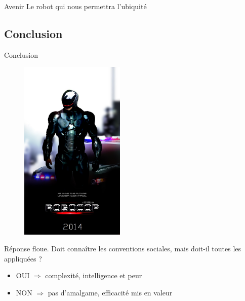 \documentclass{beamer}
\begin{document}
\begin{frame}{Avenir}
  Le robot qui nous permettra l'ubiquité\\
\end{frame}

\subsection{Conclusion}
\begin{frame}{Conclusion}
  \begin{figure}
    \centering
    \vspace*{-3cm}
    \includegraphics[width=50mm]{data/robocop}
  \end{figure}
  Réponse floue. Doit connaître les conventions sociales, mais 
  doit-il toutes les appliquées ?
  \begin{itemize}
  \item OUI $\Rightarrow$ complexité, intelligence et peur
  \item NON $\Rightarrow$ pas d'amalgame, efficacité mis en valeur
  \end{itemize}
\end{frame}
\end{document}
